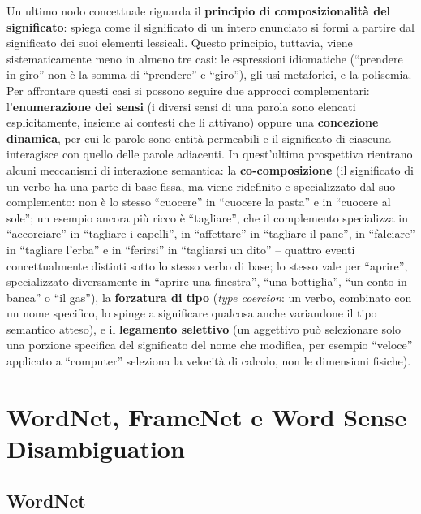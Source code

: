 \documentclass[11pt,a4paper]{report}
\begin{document}
Un ultimo nodo concettuale riguarda il \textbf{principio di composizionalità del significato}: spiega come il significato di un intero enunciato si formi a partire dal significato dei suoi elementi lessicali. Questo principio, tuttavia, viene sistematicamente meno in almeno tre casi: le espressioni idiomatiche (``prendere in giro'' non è la somma di ``prendere'' e ``giro''), gli usi metaforici, e la polisemia. Per affrontare questi casi si possono seguire due approcci complementari: l'\textbf{enumerazione dei sensi} (i diversi sensi di una parola sono elencati esplicitamente, insieme ai contesti che li attivano) oppure una \textbf{concezione dinamica}, per cui le parole sono entità permeabili e il significato di ciascuna interagisce con quello delle parole adiacenti. In quest'ultima prospettiva rientrano alcuni meccanismi di interazione semantica: la \textbf{co-composizione} (il significato di un verbo ha una parte di base fissa, ma viene ridefinito e specializzato dal suo complemento: non è lo stesso ``cuocere'' in ``cuocere la pasta'' e in ``cuocere al sole''; un esempio ancora più ricco è ``tagliare'', che il complemento specializza in ``accorciare'' in ``tagliare i capelli'', in ``affettare'' in ``tagliare il pane'', in ``falciare'' in ``tagliare l'erba'' e in ``ferirsi'' in ``tagliarsi un dito'' -- quattro eventi concettualmente distinti sotto lo stesso verbo di base; lo stesso vale per ``aprire'', specializzato diversamente in ``aprire una finestra'', ``una bottiglia'', ``un conto in banca'' o ``il gas''), la \textbf{forzatura di tipo} (\emph{type coercion}: un verbo, combinato con un nome specifico, lo spinge a significare qualcosa anche variandone il tipo semantico atteso), e il \textbf{legamento selettivo} (un aggettivo può selezionare solo una porzione specifica del significato del nome che modifica, per esempio ``veloce'' applicato a ``computer'' seleziona la velocità di calcolo, non le dimensioni fisiche).

\chapter{WordNet, FrameNet e Word Sense Disambiguation}

\section{WordNet}
\end{document}
